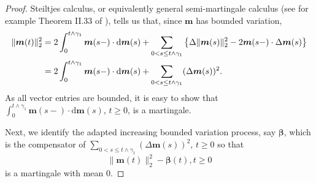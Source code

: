 \documentclass[12pt, leqno]{article}
\renewcommand{\eqref}[1]{\hyperref[#1]{(\ref*{#1})}}
\newcommand*{\norm}[1]{\lVert #1 \rVert}
\newcommand{\dd}{{\mathrm d}}
\begin{document}
\begin{proof}
Steiltjes calculus, or equivalently general semi-martingale calculus (see for example Theorem II.33 of \cite{Protter}), tells us that, since $\bm m$ has bounded variation,
\begin{align}
\norm{\bm m (t)}^2_2 &= 2\int_0^{t\wedge \gamma_1} \bm m(s-)\cdot\dd\bm m(s) +  \sum_{0<s\leq t \wedge \gamma_1}\left\{\Delta  
\norm{\bm m (s)}_2^2 - 2\bm m(s-)\cdot\Delta \bm m(s)  \right\}\notag\\
&=2\int_0^{t\wedge \gamma_1} \bm m(s-)\cdot\dd\bm m(s) +  \sum_{0<s\leq t \wedge \gamma_1}(\Delta \bm m(s))^2.
\label{prot}
\end{align}
As all vector entries are bounded, it is easy to show that 
$\textstyle\int_0^{t\wedge \gamma_1} \bm m(s-)\cdot\dd\bm m(s)$, $t\geq0$, is a martingale. 


Next, we identify the adapted increasing bounded variation process, say $\bm\beta$, which is the compensator of $ \sum_{0<s\leq t \wedge \gamma_1}(\Delta \bm m(s))^2$, $t\geq0$ so that 
\[
\norm{\bm m (t)}_2^2 -\bm\beta(t), t\geq 0
\] 
is a martingale with mean  0.


\end{proof}
\end{document}
